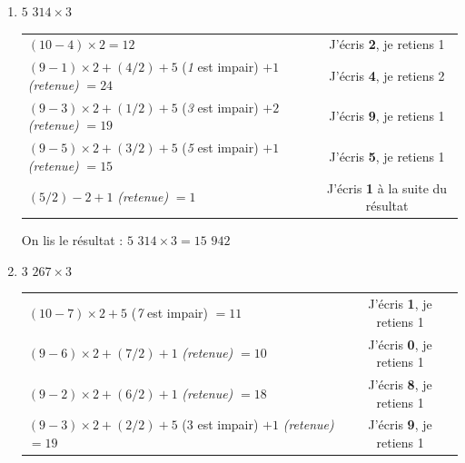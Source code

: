 \documentclass[a4paper, twoside]{article}
\begin{document}
		\begin{small}
		\begin{enumerate}

			\item $5$ $314 \times 3$

			\begin{tabular}{l|c}

				$(10 - 4) \times 2 = 12$ & J'écris \textbf{2}, je retiens 1
				
				\tabularnewline
				
				$(9 - 1) \times 2 + (4 / 2) + 5$ (\textit{1} est impair) $ + 1 $ \textit{(retenue)} $ = 24$ & J'écris \textbf{4}, je retiens 2

				\tabularnewline

				$(9 - 3) \times 2 + (1 / 2) + 5$ (\textit{3} est impair) $+ 2$ \textit{(retenue)} $= 19$ & J'écris \textbf{9}, je retiens 1
				
				\tabularnewline
				
				$(9 - 5) \times 2 + (3 / 2) + 5$ (\textit{5} est impair) $+ 1$ \textit{(retenue)} $= 15$ & J'écris \textbf{5}, je retiens 1
				
				\tabularnewline
				
				$(5 / 2) - 2 + 1$ \textit{(retenue)} $= 1$ & J'écris \textbf{1} à la suite du résultat	

			\end{tabular}

			On lis le résultat : {\boldmath $5$ $314 \times 3 = 15$ $942$}\\


			\item $3$ $267 \times 3$

			\begin{tabular}{l|c}

				$(10 - 7) \times 2 + 5$ (\textit{7} est impair) $= 11$ & J'écris \textbf{1}, je retiens 1
				
				\tabularnewline
				
				$(9 - 6) \times 2 + (7 / 2) + 1$ \textit{(retenue)} $= 10$ & J'écris \textbf{0}, je retiens 1
				
				\tabularnewline
				
				$(9 - 2) \times 2 + (6 / 2) + 1$ \textit{(retenue)} $= 18$ & J'écris \textbf{8}, je retiens 1
				
				\tabularnewline
				
				$(9 - 3) \times 2 + (2 / 2) + 5$ (3 est impair) $+ 1$ \textit{(retenue)} $= 19$ & J'écris \textbf{9}, je retiens 1
				

\end{tabular}
\end{enumerate}
\end{small}
\end{document}

